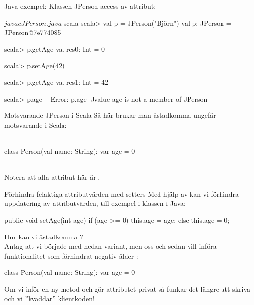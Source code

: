 \begin{Slide}{Java-exempel: Klassen JPerson}\SlideFontSmall
{} access av  attribut:
\vspace{-1em}\begin{multicols}{2}

\columnbreak

\begin{REPLnonum}[basicstyle=\SlideFontSize{7}{9}\ttfamily\color{white}]
$ javac JPerson.java
$ scala
scala> val p = JPerson("Björn")
val p: JPerson = JPerson@7e774085

scala> p.getAge
val res0: Int = 0

scala> p.setAge(42)

scala> p.getAge
val res1: Int = 42

scala> p.age
-- Error:
p.age
^^^^^
value age is not a member of JPerson
\end{REPLnonum}
\end{multicols}
\end{Slide}


\begin{Slide}{Motsvarande JPerson i Scala}
Så här brukar man åstadkomma ungefär motsvarande i Scala: \\~
\begin{Code}[basicstyle=\SlideFontSize{12}{15}\ttfamily\selectfont]
class Person(val name: String):
  var age = 0
\end{Code}
~\\
Notera att alla attribut här är .
\end{Slide}


\begin{Slide}{Förhindra felaktiga attributvärden med setters}\SlideFontSmall
Med hjälp av \Emph{setters} kan vi förhindra \Alert{felaktig} uppdatering av attributvärden, till exempel  i klassen  i Java:
\begin{Code}[language=Java]
    public void setAge(int age){
        if (age >= 0) {
            this.age = age;
        } else {
            this.age = 0;
        }
    }
\end{Code}
Hur kan vi åstadkomma ? \\
\pause
Antag att vi började med nedan variant, men  oss och sedan vill införa funktionalitet som förhindrat negativ ålder :
\begin{Code}
class Person(val name: String):
  var age = 0
\end{Code}
Om vi inför en ny metod  och gör attributet  privat så funkar det  längre att skriva   och vi ''kvaddar'' klientkoden! \code{  :(}
\end{Slide}



